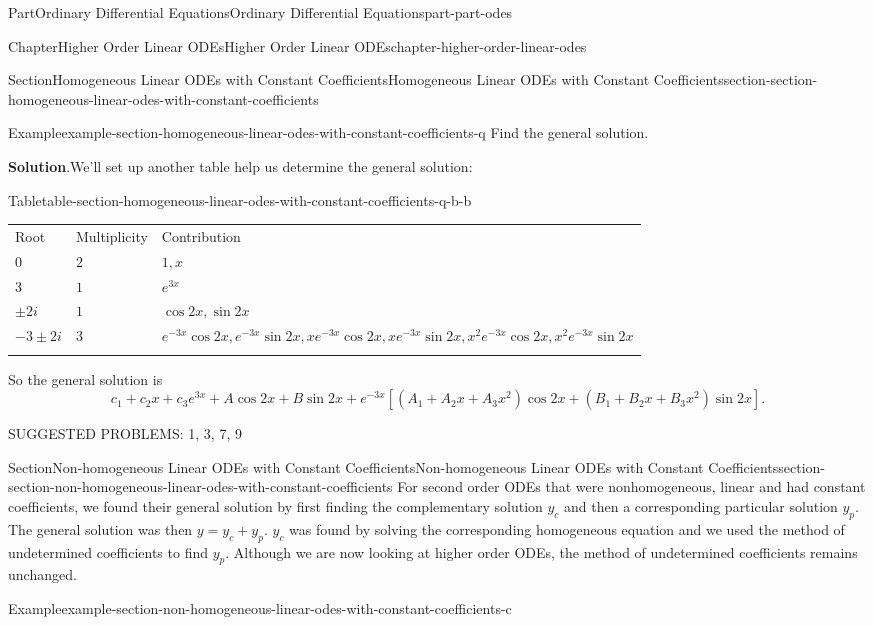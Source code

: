 \documentclass[twoside,10pt,]{book}
\newcommand{\blocktitlefont}{\relax}
\newcommand{\tabularfont}{\relax}
\numberwithin{equation}{part}
\newcommand{\hrulethick} {\noalign{\hrule height 0.11em}}
\newcommand{\brackets}[1]{\left[ #1 \right]}
\begin{document}
\begin{partptx}{Part}{Ordinary Differential Equations}{}{Ordinary Differential Equations}{}{}{part-part-odes}
\begin{chapterptx}{Chapter}{Higher Order Linear ODEs}{}{Higher Order Linear ODEs}{}{}{chapter-higher-order-linear-odes}
\begin{sectionptx}{Section}{Homogeneous Linear ODEs with Constant Coefficients}{}{Homogeneous Linear ODEs with Constant Coefficients}{}{}{section-section-homogeneous-linear-odes-with-constant-coefficients}
\begin{example}{Example}{}{example-section-homogeneous-linear-odes-with-constant-coefficients-q}
Find the general solution.%
\par\smallskip%
\noindent\textbf{\blocktitlefont Solution}.\hypertarget{solution-section-homogeneous-linear-odes-with-constant-coefficients-q-b}{}\quad{}We'll set up another table help us determine the general solution:%
\begin{tableptx}{Table}{\textbf{}}{table-section-homogeneous-linear-odes-with-constant-coefficients-q-b-b}{}%
\centering%
{\tabularfont%
\begin{tabular}{lll}\hrulethick
Root&Multiplicity&Contribution\tabularnewline\hrulethick
\(0\)&\(2\)&\(1,x\)\tabularnewline\hrulethick
\(3\)&\(1\)&\(e^{3x}\)\tabularnewline\hrulethick
\(\pm2i\)&\(1\)&\(\cos2x,\sin2x\)\tabularnewline\hrulethick
\(-3\pm2i\)&\(3\)&\(e^{-3x}\cos2x,e^{-3x}\sin2x,xe^{-3x}\cos2x,xe^{-3x}\sin2x,x^{2}e^{-3x}\cos2x,x^{2}e^{-3x}\sin2x\)\tabularnewline\hrulethick
\end{tabular}
}%
\end{tableptx}%
So the general solution is%
\begin{equation*}
c_{1}+c_{2}x+c_{3}e^{3x}+A\cos2x+B\sin2x+e^{-3x}\brackets{(A_{1}+A_{2}x+A_{3}x^{2})\cos2x+(B_{1}+B_{2}x+B_{3}x^{2})\sin2x}.
\end{equation*}
%
\end{example}
\begin{conclusion}{}%
SUGGESTED PROBLEMS: 1, 3, 7, 9%
\end{conclusion}%
\end{sectionptx}
%
%
\typeout{************************************************}
\typeout{************************************************}
%
\begin{sectionptx}{Section}{Non-homogeneous Linear ODEs with Constant Coefficients}{}{Non-homogeneous Linear ODEs with Constant Coefficients}{}{}{section-section-non-homogeneous-linear-odes-with-constant-coefficients}
For second order ODEs that were nonhomogeneous, linear and had constant coefficients, we found their general solution by first finding the complementary solution \(y_{c}\) and then a corresponding particular solution \(y_{p}\). The general solution was then \(y=y_{c}+y_{p}\). \(y_{c}\) was found by solving the corresponding homogeneous equation and we used the method of undetermined coefficients to find \(y_{p}\). Although we are now looking at higher order ODEs, the method of undetermined coefficients remains unchanged.%
\begin{example}{Example}{}{example-section-non-homogeneous-linear-odes-with-constant-coefficients-c}%

\end{example}
\end{sectionptx}
\end{chapterptx}
\end{partptx}
\end{document}
